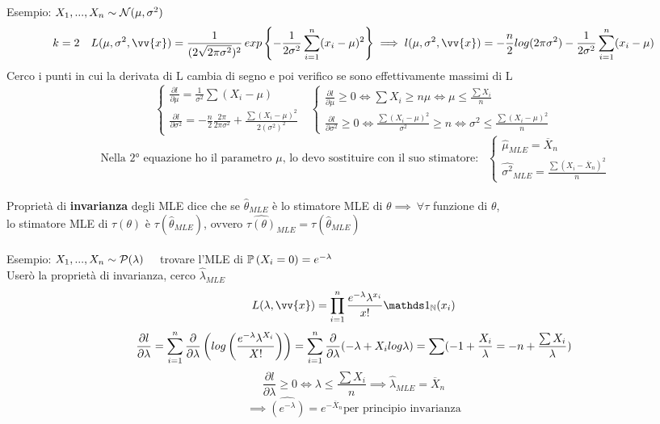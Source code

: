 Esempio: $X_1,...,X_n\sim\mathcal N (\mu,\sigma^2)$
\[k=2 \ \ \ L(\mu,\sigma^2,\vv{x})=\frac{1}{(2\sqrt{2\pi\sigma^2})^2}  \, exp \OOO -\frac{1}{2\sigma^2}\Sum{i=1}{n} (x_i-\mu)^2 \CCC  \implies l(\mu,\sigma^2,\vv{x})=-\frac{n}{2} log (2\pi\sigma^2) - \frac{1}{2\sigma^2}\Sum{i=1}{n}(x_i-\mu)\]
Cerco i punti in cui la derivata di L cambia di segno e poi verifico se sono effettivamente massimi di L
\[ \begin{cases}
    \frac{\partial l}{\partial \mu}=\frac{1}{\sigma^2}\sum (X_i-\mu)\\
    \frac{\partial l}{\partial \sigma^2} = -\frac{n}{2}\frac{2\pi}{2\pi\sigma^2}+\frac{\sum (X_i-\mu)^2}{2(\sigma^2)^2}
\end{cases} \ \ \ \begin{cases}
    \frac{\partial l}{\partial \mu}\ge 0 \Leftrightarrow \sum X_i \ge n\mu \Leftrightarrow \mu \le \frac{\sum X_i}{n}\\
    \frac{\partial l}{\partial \sigma^2}\ge 0 \Leftrightarrow \frac{\sum (X_i-\mu)^2}{\sigma^2} \ge n \Leftrightarrow \sigma^2\le \frac{\sum (X_i-\mu)^2}{n}
\end{cases} \]   \[\text{ Nella 2° equazione ho il parametro $\mu$, lo devo sostituire con il suo stimatore: } \ \ \begin{cases}
    \hat{\mu}_{MLE}=\overline{X}_n\\
    \hat{\sigma^2}_{MLE}=\frac{\sum(X_i-\overline{X}_n)^2}{n}
\end{cases}\] \\



Proprietà di \textbf{invarianza} degli MLE dice che se $\hat{\theta}_{MLE}$ è lo stimatore MLE di $\theta \implies \ \forall \tau$ funzione di $\theta$,\\ lo stimatore MLE di $\tau(\theta)$ è $\tau(\hat{\theta}_{MLE})$, ovvero $\hat{\tau(\theta)}_{MLE}=\tau(\hat{\theta}_{MLE})$\\ \\

Esempio: $X_1,...,X_n\sim \mathcal P(\lambda)$ \ \ trovare l'MLE di $\mathbb{P} \left( X_i=0 \right)= e^{-\lambda}$\\
Userò la proprietà di invarianza, cerco $\hat{\lambda}_{MLE}$
\[L(\lambda,\vv{x})=\Prod{i=1}{n} \frac{e^{-\lambda}\lambda^{x_i}}{x!}\II_{\NN}(x_i)\]
\[\dfrac{\partial l}{\partial \lambda}=\sum\limits_{i=1}^{n} \dfrac{\partial}{\partial \lambda} \left( log \left(\dfrac{e^{-\lambda}\lambda^{X_i}}{X!}\right)\right) = \sum\limits_{i=1}^{n}\dfrac{\partial}{\partial \lambda} (-\lambda + X_i log\lambda) = \sum (-1 +\dfrac{X_i}{\lambda} = -n + \dfrac{\sum X_i}{\lambda})   \] 
\[ \frac{\partial l}{\partial \lambda}\ge 0 \Leftrightarrow \lambda\le \frac{\sum X_i}{n} \implies \hat{\lambda}_{MLE}=\overline{X}_n \]
\[ \implies \hat{(e^{-\lambda})}= e^{-\overline{X}_n} \text{per principio invarianza}\] \\

